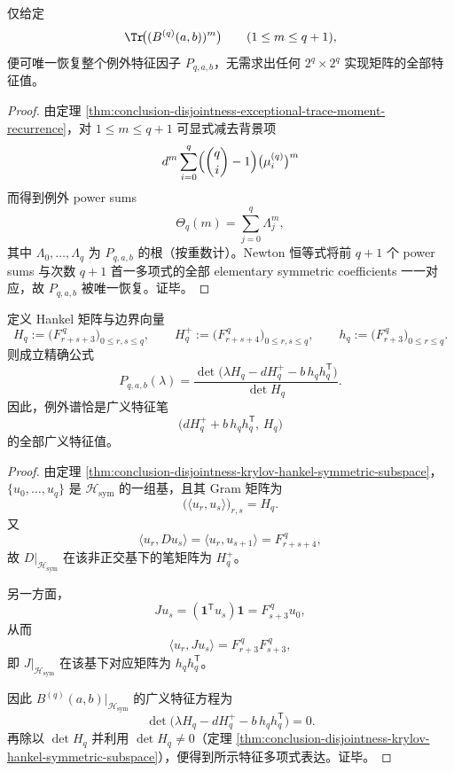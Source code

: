 \begin{corollary}\label{cor:conclusion-disjointness-exceptional-spectrum-reconstruction-from-qplus1-traces}
仅给定
\[
\Tr\!\bigl((B^{(q)}(a,b))^m\bigr)\qquad (1\le m\le q+1),
\]
便可唯一恢复整个例外特征因子 \(P_{q,a,b}\)，无需求出任何 \(2^q\times 2^q\) 实现矩阵的全部特征值。
\end{corollary}
\begin{proof}
由定理 \ref{thm:conclusion-disjointness-exceptional-trace-moment-recurrence}，对 \(1\le m\le q+1\) 可显式减去背景项
\[
d^m\sum_{i=0}^{q}\Bigl(\binom qi-1\Bigr)\bigl(\mu_i^{(q)}\bigr)^m
\]
而得到例外 power sums
\[
\Theta_q(m)=\sum_{j=0}^{q}\Lambda_j^m,
\]
其中 \(\Lambda_0,\dots,\Lambda_q\) 为 \(P_{q,a,b}\) 的根（按重数计）。Newton 恒等式将前 \(q+1\) 个 power sums 与次数 \(q+1\) 首一多项式的全部 elementary symmetric coefficients 一一对应，故 \(P_{q,a,b}\) 被唯一恢复。证毕。
\end{proof}

\begin{theorem}\label{thm:conclusion-disjointness-exceptional-hankel-gram-pencil}
定义 Hankel 矩阵与边界向量
\[
H_q:=\bigl(F_{r+s+3}^{\,q}\bigr)_{0\le r,s\le q},
\qquad
H_q^{+}:=\bigl(F_{r+s+4}^{\,q}\bigr)_{0\le r,s\le q},
\qquad
h_q:=\bigl(F_{r+3}^{\,q}\bigr)_{0\le r\le q}.
\]
则成立精确公式
\[
P_{q,a,b}(\lambda)
=
\frac{\det\!\bigl(\lambda H_q-dH_q^{+}-b\,h_qh_q^{\mathsf T}\bigr)}{\det H_q}.
\]
因此，例外谱恰是广义特征笔
\[
\bigl(dH_q^{+}+b\,h_qh_q^{\mathsf T},\,H_q\bigr)
\]
的全部广义特征值。
\end{theorem}
\begin{proof}
由定理 \ref{thm:conclusion-disjointness-krylov-hankel-symmetric-subspace}，\(\{u_0,\dots,u_q\}\) 是 \(\mathcal H_{\mathrm{sym}}\) 的一组基，且其 Gram 矩阵为
\[
\bigl(\langle u_r,u_s\rangle\bigr)_{r,s}=H_q.
\]
又
\[
\langle u_r,Du_s\rangle=\langle u_r,u_{s+1}\rangle=F_{r+s+4}^{\,q},
\]
故 \(D\big|_{\mathcal H_{\mathrm{sym}}}\) 在该非正交基下的笔矩阵为 \(H_q^{+}\)。

另一方面，
\[
Ju_s=(\mathbf 1^{\mathsf T}u_s)\mathbf 1=F_{s+3}^{\,q}u_0,
\]
从而
\[
\langle u_r,Ju_s\rangle
=
F_{r+3}^{\,q}F_{s+3}^{\,q},
\]
即 \(J\big|_{\mathcal H_{\mathrm{sym}}}\) 在该基下对应矩阵为 \(h_qh_q^{\mathsf T}\)。

因此 \(B^{(q)}(a,b)\big|_{\mathcal H_{\mathrm{sym}}}\) 的广义特征方程为
\[
\det\!\bigl(\lambda H_q-dH_q^{+}-b\,h_qh_q^{\mathsf T}\bigr)=0.
\]
再除以 \(\det H_q\) 并利用 \(\det H_q\neq 0\)（定理 \ref{thm:conclusion-disjointness-krylov-hankel-symmetric-subspace}），便得到所示特征多项式表达。证毕。
\end{proof}

